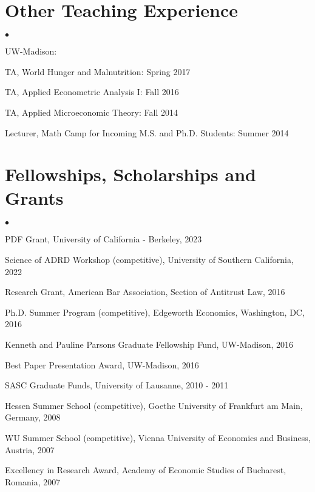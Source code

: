 \documentclass[margin,line]{res}                          %
\newenvironment{list2}{
  \begin{list}{$\bullet$}{%
      \setlength{\itemsep}{0in}
      \setlength{\parsep}{0in} \setlength{\parskip}{0in}
      \setlength{\topsep}{0in} \setlength{\partopsep}{0in} 
      \setlength{\leftmargin}{0.2in}}}{\end{list}}
\begin{document}
\begin{resume}
\section{\sc Other Teaching Experience}
\begin{list2}
\item[] UW-Madison:
\item[] TA, World Hunger and Malnutrition: Spring 2017
\item[] TA,  Applied Econometric Analysis I: Fall 2016
\item[] TA,  Applied Microeconomic Theory:  Fall 2014
\item[] Lecturer, Math Camp for Incoming M.S. and Ph.D. Students: Summer 2014 
\end{list2}

\section{\sc Fellowships, Scholarships and Grants}
\begin{list2}
\item[] PDF Grant, University of California - Berkeley, 2023
\item[] Science of ADRD Workshop (competitive), University of Southern California, 2022
\item[] Research Grant, American Bar Association, Section of Antitrust Law, 2016
\item[] Ph.D. Summer Program (competitive), Edgeworth Economics, Washington, DC, 2016
\item[] Kenneth and Pauline Parsons Graduate Fellowship Fund, UW-Madison, 2016
\item[] Best Paper Presentation Award, UW-Madison, 2016
\item[] SASC Graduate Funds, University of Lausanne, 2010 - 2011
\item[] Hessen Summer School (competitive), Goethe University of Frankfurt am Main, Germany, 2008
\item[] WU Summer School (competitive), Vienna University of Economics and Business, Austria, 2007
\item[] Excellency in Research Award, Academy of Economic Studies of Bucharest, Romania, 2007

\end{list2}


\end{resume}
\end{document}
